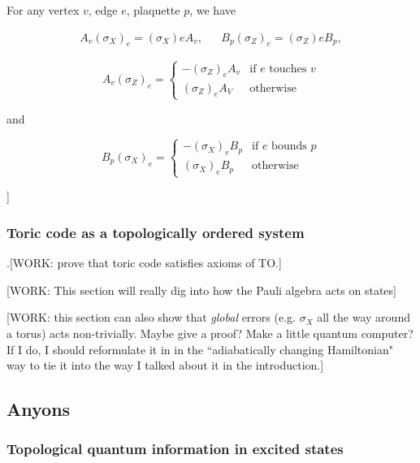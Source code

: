 \begin{lem} For any vertex $v$, edge $e$, plaquette $p$, we have

\begin{align*}
A_v  (\sigma_X)_e=(\sigma_X)e A_v, && B_p (\sigma_Z)_e=(\sigma_Z)e B_p,
\end{align*}

\begin{equation*}
A_v (\sigma_Z)_e=
\begin{cases}
- (\sigma_Z)_e A_v & \text{if $e$ touches $v$}\\
(\sigma_Z)_e A_V & \text{otherwise}
\end{cases}
\end{equation*}

and

\begin{equation*}
B_p (\sigma_X)_e=
\begin{cases}
- (\sigma_X)_e B_p & \text{if $e$ bounds $p$}\\
(\sigma_X)_e B_p & \text{otherwise}
\end{cases}
\end{equation*}


\end{lem}

]

\subsubsection{Toric code as a topologically ordered system}

.[WORK: prove that toric code satisfies axioms of TO.]

[WORK: This section will really dig into how the Pauli algebra acts on states]

[WORK: this section can also show that \textit{global} errors (e.g. $\sigma_X$ all the way around a torus) acts non-trivially. Maybe give a proof? Make a little quantum computer? If I do, I should reformulate it in in the ``adiabatically changing Hamiltonian" way to tie it into the way I talked about it in the introduction.]



\subsection{Anyons}

\subsubsection{Topological quantum information in excited states}

